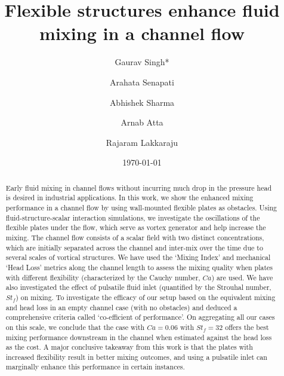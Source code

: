 \documentclass[%
 aip,
 amsmath,amssymb,
 reprint,
]{revtex4-1}
\begin{document}

\title[]{Flexible structures enhance fluid mixing in a channel flow}
\author{Gaurav Singh*}
  
\author{Arahata Senapati}%

\author{Abhishek Sharma}
\author{Arnab Atta}
	\author{Rajaram Lakkaraju}

\date{\today}%

\begin{abstract}
 Early fluid mixing in channel flows without incurring much drop in the pressure head is desired in industrial applications. In this work, we show the enhanced mixing performance in a channel flow by using wall-mounted flexible plates as obstacles. Using fluid-structure-scalar interaction simulations, we investigate the oscillations of the flexible plates under the flow, which serve as vortex generator and help increase the mixing. The channel flow consists of a scalar field with two distinct concentrations, which are initially separated across the channel and inter-mix over the time due to several scales of vortical structures. We have used the `Mixing Index' and mechanical `Head Loss' metrics along the channel length to assess the mixing quality when plates with different flexibility (characterized by the Cauchy number, $Ca$) are used. We have also investigated the effect of pulsatile fluid inlet (quantified by the Strouhal number, $St_f$) on mixing. To investigate the efficacy of our setup based on the equivalent mixing and head loss in an empty channel case (with no obstacles) and deduced a comprehensive criteria called `co-efficient of performance'. On aggregating all our cases on this scale, we conclude that the case with $Ca=0.06$ with $St_f=32$ offers the best mixing performance downstream in the channel when estimated against the head loss as the cost. A major conclusive takeaway from this work is that the plates with increased flexibility result in better mixing outcomes, and using a pulsatile inlet can marginally enhance this performance in certain instances. 
\end{abstract}
\end{document}
